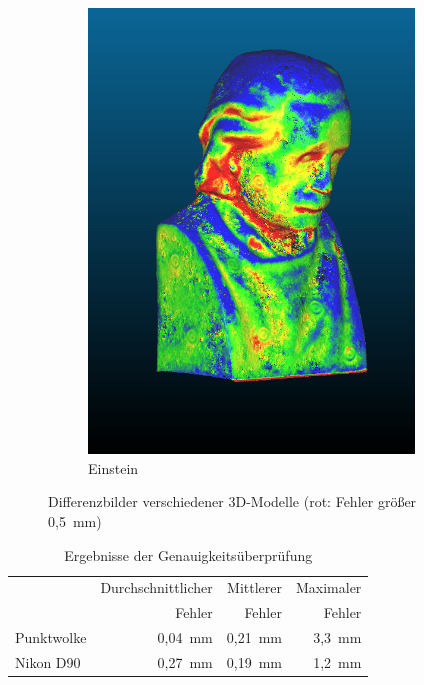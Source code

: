 \documentclass[./00PhotoBox.tex]{subfiles}
\begin{document}
\begin{figure}
\begin{subfigure}{0.3\textwidth}
        \includegraphics[width=0.95\textwidth]{img/einstein_diff.png}
        \caption{Einstein}
        \label{img:differenz_einstein}
    \end{subfigure}
    \caption{Differenzbilder verschiedener 3D-Modelle  (rot: Fehler größer 0,5~mm)}
    \label{img:differenz}
\end{figure}

\begin{table}
    \centering
    \caption{Ergebnisse der Genauigkeitsüberprüfung}
    \label{tab:vergleich_erg}
    \begin{tabular}{l|r|r|r}
        \toprule
                   & Durchschnittlicher & Mittlerer & Maximaler \\
                   & Fehler             & Fehler    & Fehler    \\
        \midrule
        Punktwolke & 0,04~mm            & 0,21~mm   & 3,3~mm    \\  %
        \midrule
        Nikon D90  & 0,27~mm            & 0,19~mm   & 1,2~mm    \\
        \bottomrule
    \end{tabular}
\end{table}
\end{document}
